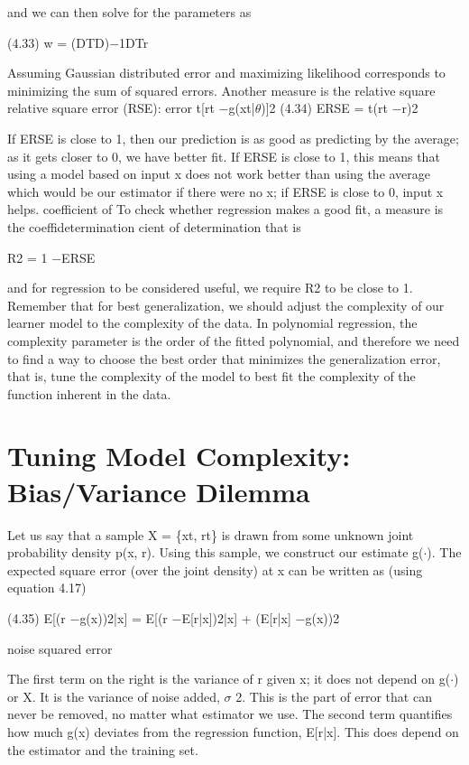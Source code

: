 and we can then solve for the parameters as

(4.33) w = (DTD)$-$1DTr

Assuming Gaussian distributed error and maximizing likelihood corresponds to minimizing the sum of squared errors. Another measure is the relative square relative square error (RSE): error t[rt $-$g(xt|$\theta$)]2 (4.34) ERSE = t(rt $-$r)2

If ERSE is close to 1, then our prediction is as good as predicting by the average; as it gets closer to 0, we have better fit. If ERSE is close to 1, this means that using a model based on input x does not work better than using the average which would be our estimator if there were no x; if ERSE is close to 0, input x helps. coefficient of To check whether regression makes a good fit, a measure is the coeffidetermination cient of determination that is

R2 = 1 $-$ERSE

and for regression to be considered useful, we require R2 to be close to 1. Remember that for best generalization, we should adjust the complexity of our learner model to the complexity of the data. In polynomial regression, the complexity parameter is the order of the fitted polynomial, and therefore we need to find a way to choose the best order that minimizes the generalization error, that is, tune the complexity of the model to best fit the complexity of the function inherent in the data.

\section{Tuning Model Complexity: Bias/Variance Dilemma}

Let us say that a sample X = \{xt, rt\} is drawn from some unknown joint probability density p(x, r). Using this sample, we construct our estimate g($\cdot$). The expected square error (over the joint density) at x can be written as (using equation 4.17)

(4.35) E[(r $-$g(x))2|x] = E[(r $-$E[r|x])2|x] + (E[r|x] $-$g(x))2

noise squared error

The first term on the right is the variance of r given x; it does not depend on g($\cdot$) or X. It is the variance of noise added, $\sigma$ 2. This is the part of error that can never be removed, no matter what estimator we use. The second term quantifies how much g(x) deviates from the regression function, E[r|x]. This does depend on the estimator and the training set.

